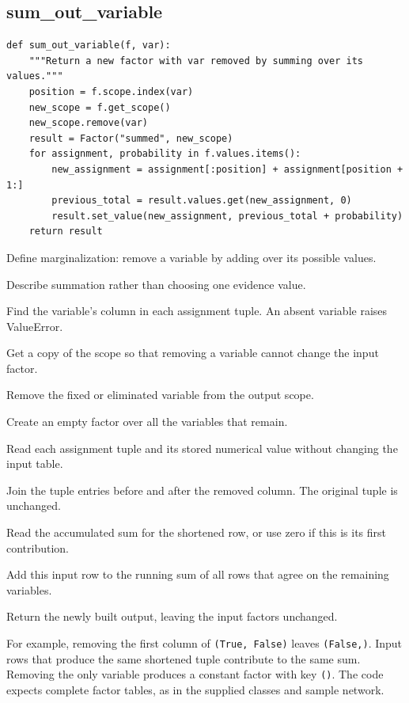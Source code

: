 \documentclass[11pt,a4paper]{article}
\begin{document}
\subsection{sum\_out\_variable}
\begin{lstlisting}
def sum_out_variable(f, var):
    """Return a new factor with var removed by summing over its values."""
    position = f.scope.index(var)
    new_scope = f.get_scope()
    new_scope.remove(var)
    result = Factor("summed", new_scope)
    for assignment, probability in f.values.items():
        new_assignment = assignment[:position] + assignment[position + 1:]
        previous_total = result.values.get(new_assignment, 0)
        result.set_value(new_assignment, previous_total + probability)
    return result
\end{lstlisting}
\begin{description}[style=nextline,leftmargin=19mm,font=\normalfont\bfseries]
\item[Line 1.] Define marginalization: remove a variable by adding over its possible values.
\item[Line 2.] Describe summation rather than choosing one evidence value.
\item[Line 3.] Find the variable's column in each assignment tuple. An absent variable raises ValueError.
\item[Line 4.] Get a copy of the scope so that removing a variable cannot change the input factor.
\item[Line 5.] Remove the fixed or eliminated variable from the output scope.
\item[Line 6.] Create an empty factor over all the variables that remain.
\item[Line 7.] Read each assignment tuple and its stored numerical value without changing the input table.
\item[Line 8.] Join the tuple entries before and after the removed column. The original tuple is unchanged.
\item[Line 9.] Read the accumulated sum for the shortened row, or use zero if this is its first contribution.
\item[Line 10.] Add this input row to the running sum of all rows that agree on the remaining variables.
\item[Line 11.] Return the newly built output, leaving the input factors unchanged.
\end{description}
For example, removing the first column of \texttt{(True, False)} leaves
\texttt{(False,)}. Input rows that produce the same shortened tuple contribute
to the same sum. Removing the only variable produces a constant factor with key
\texttt{()}. The code expects complete factor tables, as in the supplied classes
and sample network.
\end{document}
